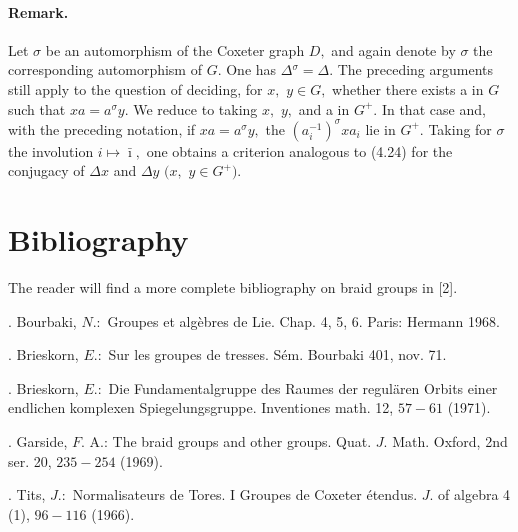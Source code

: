 \documentclass[10pt,a4paper]{article}
\begin{document}
\paragraph{Remark.} Let \ensuremath{\sigma{}} be an automorphism of the Coxeter graph \ensuremath{D,} and again denote by \ensuremath{\sigma{}} the corresponding automorphism of \ensuremath{G.} One has \ensuremath{\Delta{}^\sigma{}=\Delta{}.} The preceding arguments still apply to the question of deciding, for \ensuremath{x,} \ensuremath{y\in{}G,} whether there exists a in \ensuremath{G} such that \ensuremath{xa=a^\sigma{}y.} We reduce to taking \ensuremath{x,} \ensuremath{y,} and a in \ensuremath{G^{+}.} In that case and, with the preceding notation, if \ensuremath{xa=a^\sigma{}y,} the \ensuremath{(a_i^{-1})^\sigma{}xa_i} lie in \ensuremath{G^{+}.} Taking for \ensuremath{\sigma{}} the involution \ensuremath{i\longmapsto{}\bar{\imath},} one obtains a criterion analogous to (4.24) for the conjugacy of \ensuremath{\Delta{}x} and \ensuremath{\Delta{}y} \ensuremath{(x,} \ensuremath{y\in{}G^{+}).}

\section*{Bibliography}\begingroup\small

The reader will find a more complete bibliography on braid groups in [2].\par

. Bourbaki, \ensuremath{N.:} Groupes et algèbres de Lie. Chap. 4, 5, 6. Paris: Hermann 1968.\par

. Brieskorn, \ensuremath{E.:} Sur les groupes de tresses. Sém. Bourbaki 401, nov. 71.\par

. Brieskorn, \ensuremath{E.:} Die Fundamentalgruppe des Raumes der regulären Orbits einer endlichen komplexen Spiegelungsgruppe. Inventiones math. 12, \ensuremath{57-61} (1971).\par

. Garside, \ensuremath{F.} A.: The braid groups and other groups. Quat. \ensuremath{J.} Math. Oxford, 2nd ser. 20, \ensuremath{235-254} (1969).\par

. Tits, \ensuremath{J.:} Normalisateurs de Tores. I Groupes de Coxeter étendus. \ensuremath{J.} of algebra 4 (1), \ensuremath{96-116} (1966).\par
\end{document}
